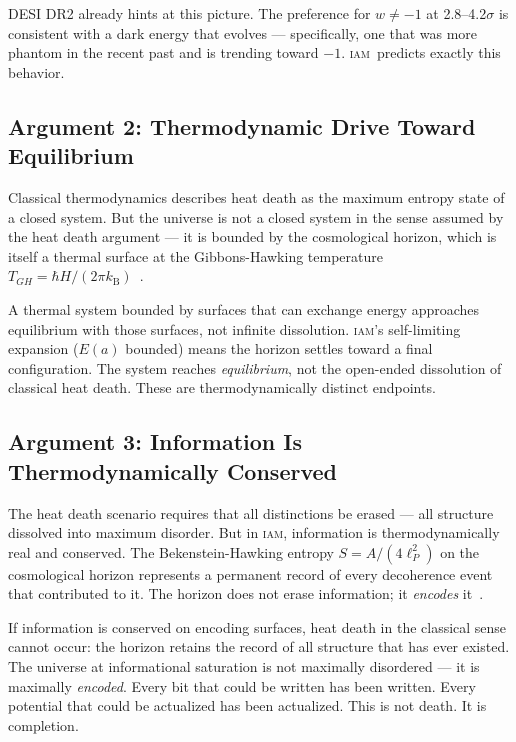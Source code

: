 \documentclass[12pt,letterpaper]{article}
\newcommand{\IAM}{\textsc{iam}}
\newcommand{\Ea}{E(a)}
\newcommand{\kB}{k_{\mathrm{B}}}
\begin{document}
DESI DR2 already hints at this picture. The preference for $w \neq -1$ at 2.8--4.2$\sigma$ is consistent with a dark energy that evolves --- specifically, one that was more phantom in the recent past and is trending toward $-1$. \IAM\ predicts exactly this behavior.

\subsection{Argument 2: Thermodynamic Drive Toward Equilibrium}

Classical thermodynamics describes heat death as the maximum entropy state of a closed system. But the universe is not a closed system in the sense assumed by the heat death argument --- it is bounded by the cosmological horizon, which is itself a thermal surface at the Gibbons-Hawking temperature $T_{GH} = \hbar H / (2\pi \kB)$~\citep{GibbonsHawking1977}.

A thermal system bounded by surfaces that can exchange energy approaches equilibrium with those surfaces, not infinite dissolution. \IAM's self-limiting expansion ($\Ea$ bounded) means the horizon settles toward a final configuration. The system reaches \emph{equilibrium}, not the open-ended dissolution of classical heat death. These are thermodynamically distinct endpoints.

\subsection{Argument 3: Information Is Thermodynamically Conserved}

The heat death scenario requires that all distinctions be erased --- all structure dissolved into maximum disorder. But in \IAM, information is thermodynamically real and conserved. The Bekenstein-Hawking entropy $S = A/(4\ell_P^2)$ on the cosmological horizon represents a permanent record of every decoherence event that contributed to it. The horizon does not erase information; it \emph{encodes} it~\citep{Bekenstein1973, Hawking1975}.

If information is conserved on encoding surfaces, heat death in the classical sense cannot occur: the horizon retains the record of all structure that has ever existed. The universe at informational saturation is not maximally disordered --- it is maximally \emph{encoded}. Every bit that could be written has been written. Every potential that could be actualized has been actualized. This is not death. It is completion.
\end{document}
